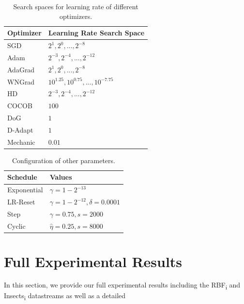\documentclass{article} %
\begin{document}
\begin{table}[h]
   \centering
   \caption{Search spaces for learning rate of different optimizers.}
   \begin{tabular}{l l}
      \toprule
      Optimizer & Learning Rate Search Space                \\
      \midrule
      SGD       & ${2^1, 2^0, ..., 2^{-8}}$                 \\
      Adam      & ${2^{-3}, 2^{-4}, ..., 2^{-12}}$          \\
      AdaGrad   & ${2^1, 2^0, ..., 2^{-8}}$                 \\
      WNGrad    & ${10^{1.25}, 10^{0.75}, ..., 10^{-7.75}}$ \\
      HD        & ${2^{-3}, 2^{-4}, ..., 2^{-12}}$          \\
      COCOB     & $100$                                     \\
      DoG       & $1$                                       \\
      D-Adapt   & $1$                                       \\
      Mechanic  & $0.01$                                    \\
      \bottomrule
   \end{tabular}
\end{table}

\begin{table}[ht]
   \centering
   \caption{Configuration of other parameters.}
   \begin{tabular}{l l}
      \toprule
      Schedule    & Values                                  \\
      \midrule
      Exponential & $\gamma = 1 - 2^{-13}$                  \\
      LR-Reset    & $\gamma = 1 - 2^{-12}, \delta = 0.0001$ \\
      Step        & $\gamma = 0.75, s = 2000$               \\
      Cyclic      & $\hat{\eta} = 0.25, s = 8000$           \\
      \bottomrule
   \end{tabular}
\end{table}
\newpage
\section{Full Experimental Results}\label{app:full_results}

In this section, we provide our full experimental results including the RBF\textsubscript{i} and Insects\textsubscript{i} datastreams as well as a detailed
\end{document}
